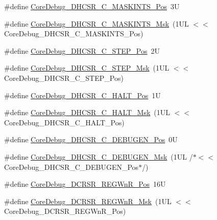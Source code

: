 \begin{DoxyCompactItemize}
\item 
\#define \hyperlink{group___c_m_s_i_s___core_debug_ga0d2907400eb948a4ea3886ca083ec8e3}{Core\+Debug\+\_\+\+D\+H\+C\+S\+R\+\_\+\+C\+\_\+\+M\+A\+S\+K\+I\+N\+T\+S\+\_\+\+Pos}~3U
\item 
\#define \hyperlink{group___c_m_s_i_s___core_debug_ga77fe1ef3c4a729c1c82fb62a94a51c31}{Core\+Debug\+\_\+\+D\+H\+C\+S\+R\+\_\+\+C\+\_\+\+M\+A\+S\+K\+I\+N\+T\+S\+\_\+\+Msk}~(1\+U\+L $<$$<$ Core\+Debug\+\_\+\+D\+H\+C\+S\+R\+\_\+\+C\+\_\+\+M\+A\+S\+K\+I\+N\+T\+S\+\_\+\+Pos)
\item 
\#define \hyperlink{group___c_m_s_i_s___core_debug_gae1fc39e80de54c0339cbb1b298a9f0f9}{Core\+Debug\+\_\+\+D\+H\+C\+S\+R\+\_\+\+C\+\_\+\+S\+T\+E\+P\+\_\+\+Pos}~2U
\item 
\#define \hyperlink{group___c_m_s_i_s___core_debug_gae6bda72fbd32cc5734ff3542170dc00d}{Core\+Debug\+\_\+\+D\+H\+C\+S\+R\+\_\+\+C\+\_\+\+S\+T\+E\+P\+\_\+\+Msk}~(1\+U\+L $<$$<$ Core\+Debug\+\_\+\+D\+H\+C\+S\+R\+\_\+\+C\+\_\+\+S\+T\+E\+P\+\_\+\+Pos)
\item 
\#define \hyperlink{group___c_m_s_i_s___core_debug_gaddf1d43f8857e4efc3dc4e6b15509692}{Core\+Debug\+\_\+\+D\+H\+C\+S\+R\+\_\+\+C\+\_\+\+H\+A\+L\+T\+\_\+\+Pos}~1U
\item 
\#define \hyperlink{group___c_m_s_i_s___core_debug_ga1d905a3aa594eb2e8bb78bcc4da05b3f}{Core\+Debug\+\_\+\+D\+H\+C\+S\+R\+\_\+\+C\+\_\+\+H\+A\+L\+T\+\_\+\+Msk}~(1\+U\+L $<$$<$ Core\+Debug\+\_\+\+D\+H\+C\+S\+R\+\_\+\+C\+\_\+\+H\+A\+L\+T\+\_\+\+Pos)
\item 
\#define \hyperlink{group___c_m_s_i_s___core_debug_gab557abb5b172b74d2cf44efb9d824e4e}{Core\+Debug\+\_\+\+D\+H\+C\+S\+R\+\_\+\+C\+\_\+\+D\+E\+B\+U\+G\+E\+N\+\_\+\+Pos}~0U
\item 
\#define \hyperlink{group___c_m_s_i_s___core_debug_gab815c741a4fc2a61988cd2fb7594210b}{Core\+Debug\+\_\+\+D\+H\+C\+S\+R\+\_\+\+C\+\_\+\+D\+E\+B\+U\+G\+E\+N\+\_\+\+Msk}~(1\+U\+L /$\ast$$<$$<$ Core\+Debug\+\_\+\+D\+H\+C\+S\+R\+\_\+\+C\+\_\+\+D\+E\+B\+U\+G\+E\+N\+\_\+\+Pos$\ast$/)
\item 
\#define \hyperlink{group___c_m_s_i_s___core_debug_ga51e75942fc0614bc9bb2c0e96fcdda9a}{Core\+Debug\+\_\+\+D\+C\+R\+S\+R\+\_\+\+R\+E\+G\+Wn\+R\+\_\+\+Pos}~16U
\item 
\#define \hyperlink{group___c_m_s_i_s___core_debug_ga1eef4992d8f84bc6c0dffed1c87f90a5}{Core\+Debug\+\_\+\+D\+C\+R\+S\+R\+\_\+\+R\+E\+G\+Wn\+R\+\_\+\+Msk}~(1\+U\+L $<$$<$ Core\+Debug\+\_\+\+D\+C\+R\+S\+R\+\_\+\+R\+E\+G\+Wn\+R\+\_\+\+Pos)
\item 

\end{DoxyCompactItemize}
